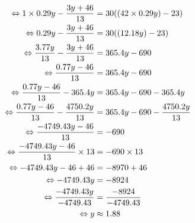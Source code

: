 \documentclass{article}%
\begin{document}
\begin{align*}%
\ \Leftrightarrow  1 \times 0.29y - \frac{3y + 46}{13} &= 30((42 \times 0.29y) - 23) \\%
\vspace{5mm}%
\newline%
\ \Leftrightarrow  0.29y - \frac{3y + 46}{13} &= 30((12.18y) - 23) \\%
\vspace{5mm}%
\newline%
\ \Leftrightarrow  \frac{3.77y}{13} - \frac{3y + 46}{13} &= 365.4y - 690 \\%
\vspace{5mm}%
\newline%
\ \Leftrightarrow    \frac{0.77y - 46}{13} &= 365.4y - 690 \\%
\vspace{5mm}%
\newline%
\ \Leftrightarrow    \frac{0.77y - 46}{13} - 365.4y &= 365.4y - 690 - 365.4y\\%
\vspace{5mm}%
\newline%
\ \Leftrightarrow    \frac{0.77y - 46}{13} - \frac{4750.2y}{13} &= 365.4y - 690 - \frac{4750.2y}{13}\\%
\vspace{5mm}%
\newline%
\ \Leftrightarrow   \frac{-4749.43y - 46}{13}  &= - 690 \\%
\vspace{5mm}%
\newline%
\ \Leftrightarrow   \frac{-4749.43y - 46}{13}  \times 13 &= - 690 \times 13 \\%
\vspace{5mm}%
\newline%
\ \Leftrightarrow   -4749.43y - 46 + 46 &= - 8970 + 46 \\%
\vspace{5mm}%
\newline%
\ \Leftrightarrow   -4749.43y &= - 8924 \\%
\vspace{5mm}%
\newline%
\ \Leftrightarrow   \frac{-4749.43y}{-4749.43} &=  \frac{-8924}{-4749.43} \\%
\vspace{5mm}%
\newline%
\ \Leftrightarrow   y &\approx  1.88 \\%
\vspace{5mm}%
\newline%
\end{align*}%
\end{document}
